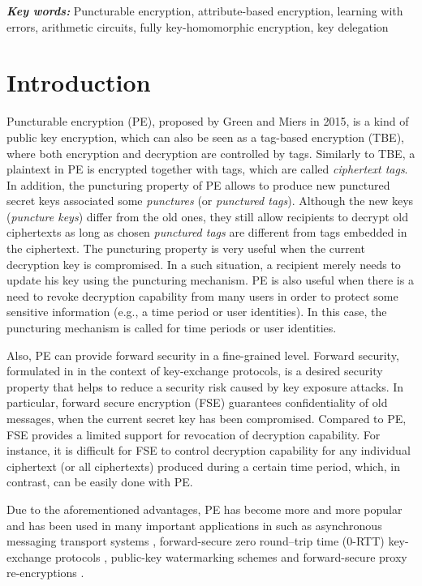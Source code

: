 \documentclass[runningheads,10pt]{llncs}
\providecommand{\keywords}[1]{\textbf{\textit{Key words: }} #1}
\begin{document}
\keywords{Puncturable encryption, attribute-based encryption, learning with errors, arithmetic circuits, fully key-homomorphic encryption, key delegation}


\section{Introduction}


Puncturable encryption (PE), proposed by Green and Miers \cite{GM15} in 2015,  is a kind of public key encryption, 
which can also be seen as a tag-based encryption (TBE), where both encryption and decryption are controlled by tags. 
Similarly to TBE, a plaintext in PE is encrypted together with tags, which are called \textit{ciphertext tags}. 
In addition, the puncturing property of PE allows to produce new punctured secret keys associated 
some \textit{punctures} (or \textit{punctured tags}).  
Although the new keys (\textit{puncture keys}) differ from the old ones, they still allow recipients to decrypt old ciphertexts as long as chosen \textit{punctured tags} are different from tags embedded in the ciphertext. 
The puncturing  property is very useful when the current decryption key is compromised.
In a such situation, a recipient merely needs  to update his key using the puncturing mechanism.
PE is also useful when there is a need to revoke decryption capability from many users 
in order to protect some sensitive information (e.g., a time period or user identities).
In this case, the puncturing mechanism is called for time periods or user identities.

 Also, PE can provide  forward security in a fine-grained level.
Forward security, formulated in \cite{Gun90} in the context of key-exchange protocols, is a desired security property 
that helps to reduce a security risk caused by key exposure attacks.
In particular, forward secure encryption (FSE) guarantees confidentiality of old messages, 
when the current secret key has been compromised. 
Compared to PE, FSE provides a limited support for revocation of decryption capability.
For instance, it is difficult for FSE to control decryption capability for any individual ciphertext
(or all ciphertexts) produced during a certain time period, 
which, in contrast, can be easily done with PE.

Due to the aforementioned advantages, 
PE has become more and more popular and has been used in many important applications in such as
asynchronous messaging transport systems \cite{GM15},
forward-secure zero round--trip time  (0-RTT) key-exchange protocols \cite{GHJ+17, DJSS18}, 
public-key watermarking schemes \cite{CHN+16} and
forward-secure proxy re-encryptions  \cite{DKL+18}.\\
\end{document}
